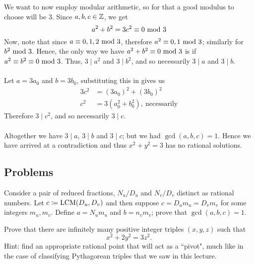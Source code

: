 \begin{itemize}[itemsep = 2em]
\begin{itemize}
We want to now employ modular arithmetic, so for that a good modulus to choose will be $3$. Since $a,b,c \in \mathbb Z$, we get
\[a^2 + b^2 = 3c^2 \equiv 0 \text{ mod }{3}\]
Now, note that since $a \equiv 0,1,2\text{ mod }{3}$, therefore $a^2 \equiv 0,1\text{ mod }{3}$; similarly for $b^2\text{ mod }{3}$. Hence, the only way we have $a^2 + b^2 \equiv 0\text{ mod }{3}$ is if $a^2 \equiv b^2 \equiv 0\text{ mod }{3}$. Thus, $3\mid a^2$ and $3\mid b^2$, and so necessarily $3\mid a$ and $3\mid b$.\\
\\
Let $a = 3a_0$ and $b = 3b_0$, substituting this in  gives us
\begin{align*}
3c^2 &= (3a_0)^2 + (3b_0)^2\\[0.5em]
c^2 &= 3(a_0^2 + b_0^2),\ \text{necessarily}
\end{align*}
Therefore $3\mid c^2$, and so necessarily $3\mid c$.\\
\\
Altogether we have $3\mid a,\,3\mid b$ and $3\mid c$; but we had $\gcd(a,b,c) = 1$. Hence we have arrived at a contradiction and thus $x^2 + y^2 = 3$ has no rational solutions.
\end{itemize}
\end{itemize}

\vspace*{0.5in}

\subsection{Problems}
\vspace{0.1in}

\begin{problem}\label{Problem 8.1}
Consider a pair of reduced fractions, $N_u/D_u$ and $N_v/D_v$ distinct as rational numbers. Let $c\coloneqq \operatorname{LCM}(D_u,D_v)$ and then suppose $c = D_um_u = D_vm_v$ for some integers $m_u,m_v$. Define $a = N_um_u$ and $b = n_vm_v$; prove that $\gcd(a,b,c) = 1$.
\end{problem}

\vspace{0.1in}

\begin{problem}\label{Problem 8.2}
Prove that there are infinitely many positive integer triples $(x,y,z)$ such that \[x^2 + 2y^2 = 3z^2.\]
{\footnotesize Hint: find an appropriate rational point that will act as a ``pivot", much like in the case of classifying Pythagorean triples that we saw in this lecture.}
\end{problem}

